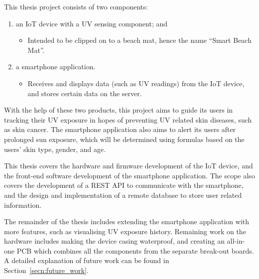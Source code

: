 \documentclass[12pt,openany,a4paper]{book}
\newcommand{\secn}[1] {Section~\ref{#1}}	%
\begin{document}
This thesis project consists of two components:
\begin{enumerate}
	\item an IoT device with a UV sensing component; and
	\begin{itemize}
		\item Intended to be clipped on to a beach mat, hence the name ``Smart
		Beach Mat''.
	\end{itemize}
	\item a smartphone application.
	\begin{itemize}
		\item Receives and displays data (such as UV readings) from the IoT
		device, and stores certain data on the server.
	\end{itemize}
\end{enumerate}
With the help of these two products, this project aims to guide its users in
tracking their UV exposure in hopes of preventing UV related skin diseases,
such as skin cancer. The smartphone application also aims to alert its users
after prolonged sun exposure, which will be determined using formulas based on
the users' skin type, gender, and age.

This thesis covers the hardware and firmware development of the IoT device, and
the front-end software development of the smartphone application. The scope also
covers the development of a REST API to communicate with the smartphone, and the
design and implementation of a remote database to store user related information.

The remainder of the thesis includes extending the smartphone application with
more features, such as visualising UV exposure history. Remaining work on the
hardware includes making the device casing waterproof, and creating an
all-in-one PCB which combines all the components from the separate break-out
boards. A detailed explanation of future work can be found in
\secn{secn:future_work}.


\cleardoublepage
\end{document}
